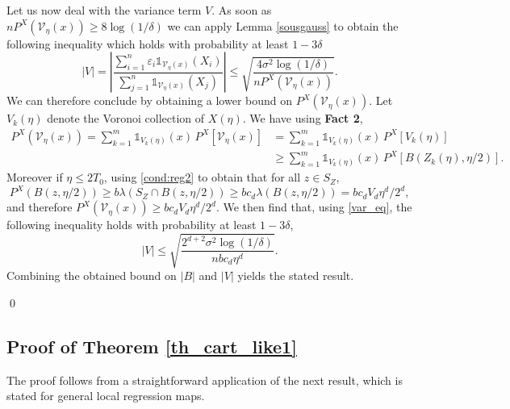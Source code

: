 \documentclass[paper=a4, fontsize=11pt]{scrartcl}
\newcommand{\ind}{\mathds{1}}
\begin{document}
Let us now deal with the variance term $V$. As soon as $nP^X(\mathcal{V}_\eta(x)) \geq 8 \log(1/\delta)$ we can apply Lemma \ref{sousgauss} to obtain the following inequality which holds with probability at least $1 - 3\delta$
\begin{equation}\label{var_eq}
    |V| = \left| \dfrac{\sum_{i=1}^n \varepsilon_i \ind _{\mathcal{V}_\eta(x) }(X_i)}{{\sum_{j=1}^n \ind _{\mathcal{V}_\eta(x)}(X_j)}} \right|     \leq \sqrt{\dfrac{4\sigma^2 \log(1/\delta)}{n P^X(\mathcal{V}_\eta(x))} }.
\end{equation} 
   We can therefore conclude by obtaining a lower bound on $ P^X (\mathcal V_\eta (x) ) $. Let $V_k(\eta)$ denote the Voronoi collection of $X(\eta)$.  We have  using \textbf{Fact 2},
\begin{align*}
    P^X (\mathcal V_\eta (x) )  
     = \sum _{k=1} ^ m \ind_{ V_k(\eta) }(x) \, P^X[ \mathcal{V}_\eta(x) ]  &= \sum _{k=1} ^ m \ind_{V_k(\eta) }(x) \, P^X[  V_k (\eta) ] \\ &\geq \sum _{k=1} ^ m \ind_{V_k(\eta) }(x) \, P^X[ B ( Z_k(\eta) , \eta /2) ].
\end{align*}
 Moreover if $\eta\leq 2T_0$, using \ref{cond:reg2} to obtain that for all $z \in S_Z$, $$P^X(B ( z , \eta /2)) \geq b \lambda(S_Z \cap B ( z , \eta /2)) \geq b c_d  \lambda(B ( z , \eta /2)) = b c_d V_d \eta^d/2^d,$$ and therefore $P^X (\mathcal{V}_\eta(x) )  \geq b {c_d} V_d \eta^d / {2^d}.$ We then find that, using \eqref{var_eq}, the following inequality holds with probability at least $1-3\delta$, 
 $$|V| \leq \sqrt{\dfrac{2^{d+2} \sigma^2 \log(1/\delta)}{n b c_d \eta^d} }.$$
 Combining the obtained bound on $|B|$ and $|V|$ yields the stated result.

\qed


\subsection*{Proof of Theorem \ref{th_cart_like1}}

The proof follows from a straightforward application of the next result, which is stated for general local regression maps. 
\end{document}
